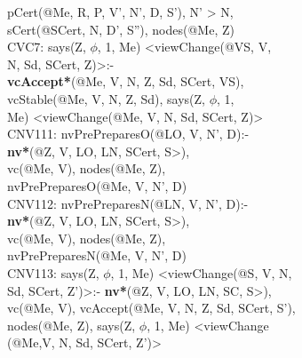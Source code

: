 \begin{code}
\> pCert(@Me, R, P, V', N', D, S'), N' > N,\\
\> sCert(@SCert, N, D', S''), nodes(@Me, Z)\\
CVC7: says(Z, $\phi$, 1, Me) <viewChange(@VS, V, \\
\> N, Sd, SCert, Z)>:-\\
\> \textbf{vcAccept*}(@Me, V, N, Z, Sd, SCert, VS),\\
\> vcStable(@Me, V, N, Z, Sd), says(Z, $\phi$, 1, \\
\> Me) <viewChange(@Me, V, N, Sd, SCert, Z)>\\
CNV111: nvPrePreparesO(@LO, V, N', D):-\\
\> \textbf{nv*}(@Z, V, LO, LN, SCert, S>),\\
\> vc(@Me, V), nodes(@Me, Z), \\
\> nvPrePreparesO(@Me, V, N', D)\\
CNV112: nvPrePreparesN(@LN, V, N', D):-\\
\> \textbf{nv*}(@Z, V, LO, LN, SCert, S>),\\
\> vc(@Me, V), nodes(@Me, Z), \\
\> nvPrePreparesN(@Me, V, N', D)\\
CNV113: says(Z, $\phi$, 1, Me) <viewChange(@S, V, N, \\
\> Sd, SCert, Z')>:- \textbf{nv*}(@Z, V, LO, LN, SC, S>),\\
\> vc(@Me, V), vcAccept(@Me, V, N, Z, Sd, SCert, S'),\\
\> nodes(@Me, Z), says(Z, $\phi$, 1, Me) <viewChange \\
\> (@Me,V, N, Sd, SCert, Z')>\\


\end{code}
